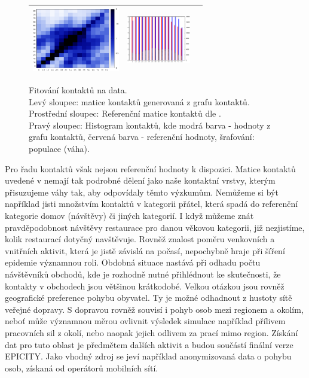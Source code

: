 \begin{figure}
\begin{center}
\begin{tabular}{|ccc|}
      \includegraphics[width=38mm]{pic/all_mat_ref.eps} &
      \includegraphics[width=28mm]{pic/all.eps}\\
      \hline

\end{tabular}
\end{center}
\caption{Fitování kontaktů na data.  \\ Levý sloupec: matice kontaktů generovaná z grafu kontaktů. \\ Prostřední sloupec: Referenční matice kontaktů dle \cite{Prem_etal2017}. \\ Pravý sloupec: Histogram kontaktů, kde modrá barva - hodnoty z grafu kontaktů, červená barva - referenční hodnoty, šrafování: populace (váha).}
\label{maticekontaktu}
\end{figure}

Pro řadu kontaktů však nejsou referenční hodnoty k dispozici. Matice kontaktů uvedené v \cite{Prem_etal2017} nemají tak podrobné dělení jako naše kontaktní vrstvy, kterým přisuzujeme váhy tak, aby odpovídaly těmto výzkumům. Nemůžeme si být například jisti množstvím kontaktů v kategorii přátel, která spadá do referenční kategorie domov (návštěvy) či jiných kategorií. I když můžeme znát pravděpodobnost návštěvy restaurace pro danou věkovou kategorii, již nezjistíme, kolik restaurací dotyčný navštěvuje. Rovněž znalost poměru venkovních a vnitřních aktivit, která je jistě závislá na počasí, nepochybně hraje při šíření epidemie významnou roli. Obdobná situace nastává při odhadu počtu návštěvníků obchodů, kde je rozhodně nutné přihlédnout ke skutečnosti, že kontakty v obchodech jsou většinou krátkodobé.
Velkou otázkou jsou rovněž geografické preference pohybu obyvatel. Ty je možné odhadnout z hustoty sítě veřejné dopravy. S dopravou rovněž souvisí i pohyb osob mezi regionem a okolím, neboť může významnou měrou ovlivnit výsledek simulace například přílivem pracovních sil z okolí, nebo naopak jejich odlivem za prací mimo region. Získání dat pro tuto oblast je předmětem dalších aktivit a budou součástí finální verze EPICITY. Jako vhodný zdroj se jeví například anonymizovaná data o pohybu osob, získaná od operátorů mobilních sítí. 

